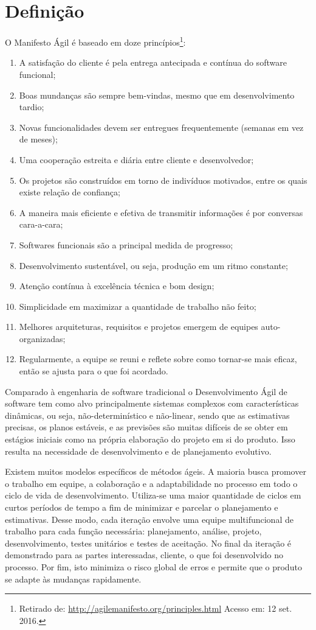 \section{Definição}
\par O Manifesto Ágil é baseado em doze princípios\footnote{Retirado de: \url{http://agilemanifesto.org/principles.html} Acesso em: 12 set. 2016.}:
\begin{enumerate}
  \item A satisfação do cliente é pela entrega antecipada e contínua do software funcional;
  \item Boas mundanças são sempre bem-vindas, mesmo que em desenvolvimento tardio;
  \item Novas funcionalidades devem ser entregues frequentemente (semanas em vez de meses);
  \item Uma cooperação estreita e diária entre cliente e desenvolvedor;
  \item Os projetos são construídos em torno de indivíduos motivados, entre os quais existe relação de confiança;
  \item A maneira mais eficiente e efetiva de transmitir informações é por conversas cara-a-cara;
  \item Softwares funcionais são a principal medida de progresso;
  \item Desenvolvimento sustentável, ou seja, produção em um ritmo constante;
  \item Atenção contínua à excelência técnica e bom design;
  \item Simplicidade em maximizar a quantidade de trabalho não feito;
  \item Melhores arquiteturas, requisitos e projetos emergem de equipes auto-organizadas;
  \item Regularmente, a equipe se reuni e reflete sobre como tornar-se mais eficaz, então se ajusta para o que foi acordado.
\end{enumerate}
\par Comparado à engenharia de software tradicional o Desenvolvimento Ágil de software tem como alvo principalmente sistemas complexos com características dinâmicas, ou seja, não-determinístico e não-linear, sendo que as estimativas precisas, os planos estáveis, e as previsões são muitas difíceis de se obter em estágios iniciais como na própria elaboração do projeto em si do produto. Isso resulta na necessidade de desenvolvimento e de planejamento evolutivo.
\par Existem muitos modelos específicos de métodos ágeis. A maioria busca promover o trabalho em equipe, a colaboração e a adaptabilidade no processo em todo o ciclo de vida de desenvolvimento. Utiliza-se uma maior quantidade de ciclos em curtos períodos de tempo a fim de minimizar e parcelar o planejamento e estimativas. Desse modo, cada iteração envolve uma equipe multifuncional de trabalho para cada função necessária: planejamento, análise, projeto, desenvolvimento, testes unitários e testes de aceitação. No final da iteração é demonstrado para as partes interessadas, cliente, o que foi desenvolvido no processo. Por fim, isto minimiza o risco global de erros e permite que o produto se adapte às mudanças rapidamente.
